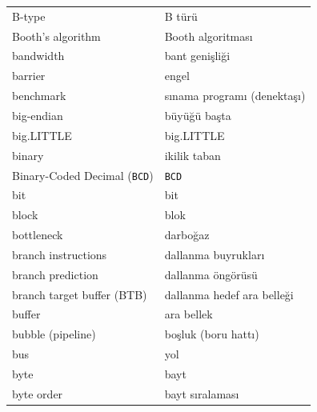 {\begin{longtable}{@{}p{7.6cm}p{7.6cm}@{}}
B-type & B türü \\
Booth's algorithm & Booth algoritması \\
bandwidth & bant genişliği \\
barrier & engel \\
benchmark & sınama programı (denektaşı) \\
big-endian & büyüğü başta \\
big.LITTLE & big.LITTLE \\
binary & ikilik taban \\
Binary-Coded Decimal (\texttt{BCD}) & \texttt{BCD} \\
bit & bit \\
block & blok \\
bottleneck & darboğaz \\
branch instructions & dallanma buyrukları \\
branch prediction & dallanma öngörüsü \\
branch target buffer (BTB) & dallanma hedef ara belleği \\
buffer & ara bellek \\
bubble (pipeline) & boşluk (boru hattı) \\
bus & yol \\
byte & bayt \\
byte order & bayt sıralaması \\


\end{longtable}}
